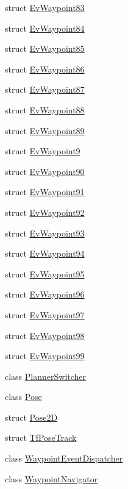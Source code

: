 \begin{DoxyCompactItemize}
struct \hyperlink{structcl__move__base__z_1_1EvWaypoint83}{Ev\+Waypoint83}
\item 
struct \hyperlink{structcl__move__base__z_1_1EvWaypoint84}{Ev\+Waypoint84}
\item 
struct \hyperlink{structcl__move__base__z_1_1EvWaypoint85}{Ev\+Waypoint85}
\item 
struct \hyperlink{structcl__move__base__z_1_1EvWaypoint86}{Ev\+Waypoint86}
\item 
struct \hyperlink{structcl__move__base__z_1_1EvWaypoint87}{Ev\+Waypoint87}
\item 
struct \hyperlink{structcl__move__base__z_1_1EvWaypoint88}{Ev\+Waypoint88}
\item 
struct \hyperlink{structcl__move__base__z_1_1EvWaypoint89}{Ev\+Waypoint89}
\item 
struct \hyperlink{structcl__move__base__z_1_1EvWaypoint9}{Ev\+Waypoint9}
\item 
struct \hyperlink{structcl__move__base__z_1_1EvWaypoint90}{Ev\+Waypoint90}
\item 
struct \hyperlink{structcl__move__base__z_1_1EvWaypoint91}{Ev\+Waypoint91}
\item 
struct \hyperlink{structcl__move__base__z_1_1EvWaypoint92}{Ev\+Waypoint92}
\item 
struct \hyperlink{structcl__move__base__z_1_1EvWaypoint93}{Ev\+Waypoint93}
\item 
struct \hyperlink{structcl__move__base__z_1_1EvWaypoint94}{Ev\+Waypoint94}
\item 
struct \hyperlink{structcl__move__base__z_1_1EvWaypoint95}{Ev\+Waypoint95}
\item 
struct \hyperlink{structcl__move__base__z_1_1EvWaypoint96}{Ev\+Waypoint96}
\item 
struct \hyperlink{structcl__move__base__z_1_1EvWaypoint97}{Ev\+Waypoint97}
\item 
struct \hyperlink{structcl__move__base__z_1_1EvWaypoint98}{Ev\+Waypoint98}
\item 
struct \hyperlink{structcl__move__base__z_1_1EvWaypoint99}{Ev\+Waypoint99}
\item 
class \hyperlink{classcl__move__base__z_1_1PlannerSwitcher}{Planner\+Switcher}
\item 
class \hyperlink{classcl__move__base__z_1_1Pose}{Pose}
\item 
struct \hyperlink{structcl__move__base__z_1_1Pose2D}{Pose2D}
\item 
struct \hyperlink{structcl__move__base__z_1_1TfPoseTrack}{Tf\+Pose\+Track}
\item 
class \hyperlink{classcl__move__base__z_1_1WaypointEventDispatcher}{Waypoint\+Event\+Dispatcher}
\item 
class \hyperlink{classcl__move__base__z_1_1WaypointNavigator}{Waypoint\+Navigator}
\end{DoxyCompactItemize}
